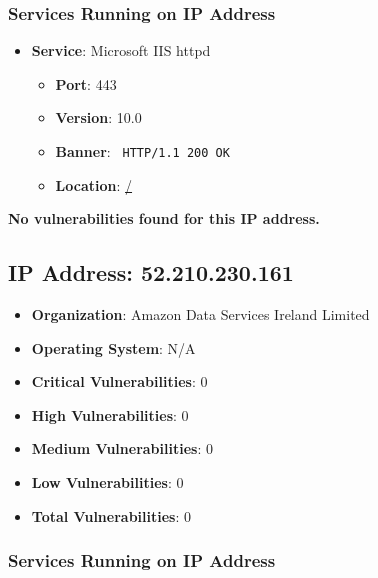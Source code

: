 \documentclass{article}
\begin{document}
\subsubsection*{Services Running on IP Address}

\begin{itemize}
    
        \item \textbf{Service}: Microsoft IIS httpd
        \begin{itemize}
            \item \textbf{Port}: 443
            \item \textbf{Version}:  10.0 
            \item \textbf{Banner}: \texttt{
                HTTP/1.1 200 OK
            }
            \item \textbf{Location}: \href{ / }{ / }
        \end{itemize}
    
\end{itemize}


\textbf{No vulnerabilities found for this IP address.}




\clearpage



\subsection*{IP Address: 52.210.230.161}

\begin{itemize}
    \item \textbf{Organization}: Amazon Data Services Ireland Limited
    \item \textbf{Operating System}:  N/A 
    \item \textbf{Critical Vulnerabilities}: 0
    \item \textbf{High Vulnerabilities}: 0
    \item \textbf{Medium Vulnerabilities}: 0
    \item \textbf{Low Vulnerabilities}: 0
    \item \textbf{Total Vulnerabilities}: 0
\end{itemize}

\subsubsection*{Services Running on IP Address}
\end{document}
